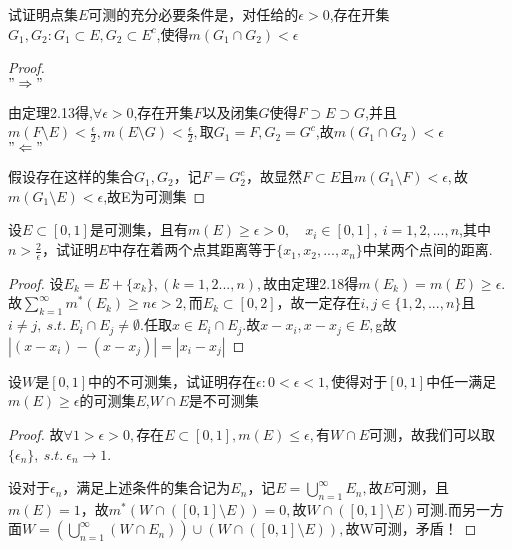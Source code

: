 试证明点集$E$可测的充分必要条件是，对任给的$\epsilon>0$,存在开集$G_1,G_2:G_1\subset E,G_2\subset E^c$,使得$m(G_1\cap G_2)<\epsilon$
\begin{proof}
\\	$"\Rightarrow"$\par
	由定理2.13得,$\forall \epsilon>0$,存在开集$F$以及闭集$G$使得$F\supset E\supset G$,并且$m(F\setminus E)<\displaystyle{\frac{\epsilon}{2}},m(E\setminus G)<\displaystyle{\frac{\epsilon}{2}},$取$G_1=F,G_2=G^c$,故$m(G_1\cap G_2)<\epsilon$\\
	$"\Leftarrow"$\par 
	假设存在这样的集合$G_1,G_2$，记$F=G_2^c$，故显然$F\subset E$且$m(G_1\setminus F)<\epsilon,$故$m(G_1\setminus E)<\epsilon$,故E为可测集
\end{proof}



设$E\subset [0,1]$是可测集，且有$m(E)\geq \epsilon>0,\quad x_i\in[0,1],\ i=1,2,...,n$,其中$\displaystyle{n>\frac{2}{\epsilon}}$，试证明$E$中存在着两个点其距离等于$\{x_1,x_2,...,x_n\}$中某两个点间的距离.
\begin{proof}
	设$E_k=E+\{x_k\},(k=1,2...,n),$故由定理2.18得$m(E_k)=m(E)\geq\epsilon.$故$\sum\limits_{k=1}^{\infty}m^*(E_k)\geq n\epsilon>2,$而$E_k\subset[0,2]$，故一定存在$i,j\in\{1,2,...,n\}$且$i\neq j,\ s.t.\ E_i\cap E_j\neq \emptyset.$任取$x\in E_i\cap E_j.$故$x-x_i,x-x_j\in E,$g故$|(x-x_i)-(x-x_j)|=|x_i-x_j|$
\end{proof}



设$W$是$[0,1]$中的不可测集，试证明存在$\epsilon:0<\epsilon<1,$使得对于$[0,1]$中任一满足$m(E)\geq\epsilon$的可测集$E$,$W\cap E$是不可测集
\begin{proof}
	故$\forall 1>\epsilon>0,$存在$E\subset[0,1],m(E)\leq \epsilon,$有$W\cap E$可测，故我们可以取$\{\epsilon_n\},\ s.t.\ \epsilon_n\to 1$.\par 设对于$\epsilon_n$，满足上述条件的集合记为$E_n$，记$E=\bigcup\limits_{n=1}^{\infty}E_n,$故$E$可测，且$m(E)=1$，故$m^*\left( W\cap ([0,1]\setminus E)\right) =0 ,$故$W\cap \left( [0,1]\setminus E\right) $可测.而另一方面$W=\left(\bigcup\limits_{n=1 }^{\infty}(W\cap E_n)\right)\cup \left( W\cap ([0,1]\setminus E)\right) , $故W可测，矛盾！
\end{proof}




